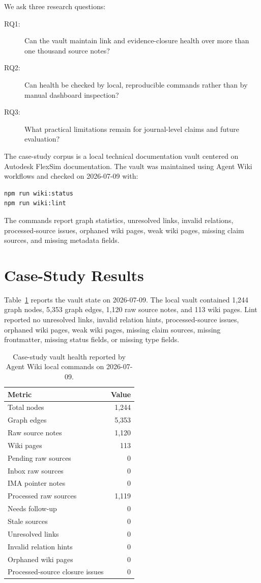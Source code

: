 \documentclass[11pt]{article}
\begin{document}
We ask three research questions:

\begin{description}
  \item[RQ1:] Can the vault maintain link and evidence-closure health over more
  than one thousand source notes?
  \item[RQ2:] Can health be checked by local, reproducible commands rather than
  by manual dashboard inspection?
  \item[RQ3:] What practical limitations remain for journal-level claims and
  future evaluation?
\end{description}

The case-study corpus is a local technical documentation vault centered on
Autodesk FlexSim documentation. The vault was maintained using Agent Wiki
workflows and checked on 2026-07-09 with:

\begin{verbatim}
npm run wiki:status
npm run wiki:lint
\end{verbatim}

The commands report graph statistics, unresolved links, invalid relations,
processed-source issues, orphaned wiki pages, weak wiki pages, missing claim
sources, and missing metadata fields.

\section{Case-Study Results}

Table~\ref{tab:case} reports the vault state on 2026-07-09. The local vault
contained 1,244 graph nodes, 5,353 graph edges, 1,120 raw source notes, and 113
wiki pages. Lint reported no unresolved links, invalid relation hints,
processed-source issues, orphaned wiki pages, weak wiki pages, missing claim
sources, missing frontmatter, missing status fields, or missing type fields.

\begin{table}[t]
\centering
\begin{tabular}{lr}
\toprule
Metric & Value \\
\midrule
Total nodes & 1,244 \\
Graph edges & 5,353 \\
Raw source notes & 1,120 \\
Wiki pages & 113 \\
Pending raw sources & 0 \\
Inbox raw sources & 0 \\
IMA pointer notes & 0 \\
Processed raw sources & 1,119 \\
Needs follow-up & 0 \\
Stale sources & 0 \\
Unresolved links & 0 \\
Invalid relation hints & 0 \\
Orphaned wiki pages & 0 \\
Processed-source closure issues & 0 \\
\bottomrule
\end{tabular}
\caption{Case-study vault health reported by Agent Wiki local commands on
2026-07-09.}
\label{tab:case}
\end{table}
\end{document}
